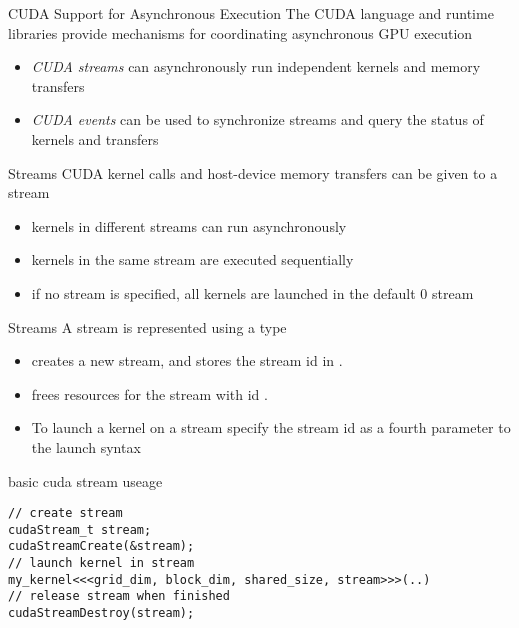 \begin{frame}[fragile]{CUDA Support for Asynchronous Execution}
    The CUDA language and runtime libraries provide mechanisms for coordinating asynchronous GPU execution

    \begin{itemize}
        \item \emph{CUDA streams} can asynchronously run independent kernels and memory transfers
        \item \emph{CUDA events} can be used to synchronize streams and query the status of kernels and transfers
    \end{itemize}

\end{frame}

\begin{frame}[fragile]{Streams}
    CUDA kernel calls and host-device memory transfers can be given to a stream
    \begin{itemize}
        \item kernels in different streams can run asynchronously
        \item kernels in the same stream are executed sequentially
        \item if no stream is specified, all kernels are launched in the default 0 stream
    \end{itemize}

\end{frame}

\begin{frame}[fragile]{Streams}
    A stream is represented using a  type
    \begin{itemize}
        \item {} creates a new stream, and stores the stream id in .
        \item {} frees resources for the stream with id .
        \item To launch a kernel on a stream specify the stream id as a fourth parameter to the launch syntax \\ 
    \end{itemize}

    \begin{code}{basic cuda stream useage}
        \begin{lstlisting}[style=boxcudatiny]
// create stream
cudaStream_t stream;
cudaStreamCreate(&stream);
// launch kernel in stream
my_kernel<<<grid_dim, block_dim, shared_size, stream>>>(..)
// release stream when finished
cudaStreamDestroy(stream);
        \end{lstlisting}
\end{code}

\end{frame}

